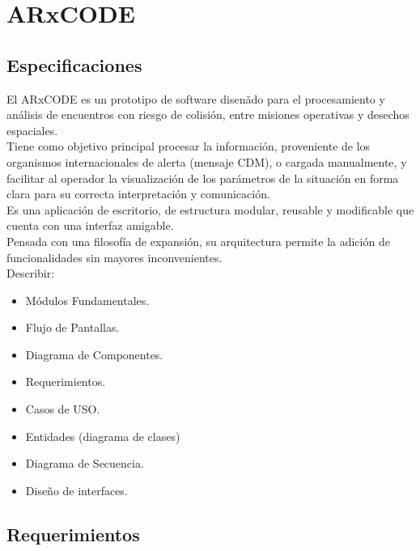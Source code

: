 \chapter{ARxCODE}
\label{chap:arxcode} 

\section{Especificaciones}

El ARxCODE es un prototipo de software disen\~ado para el procesamiento y an\'alisis de encuentros con riesgo de colisi\'on, entre misiones operativas y desechos espaciales.\\
Tiene como objetivo principal procesar la informaci\'on, proveniente de los organismos internacionales de alerta (mensaje CDM), o cargada manualmente, y facilitar al operador la visualizaci\'on de los par\'ametros de la situaci\'on en forma clara para su correcta interpretaci\'on y comunicaci\'on.\\
Es una aplicaci\'on de escritorio, de estructura modular, reusable y modificable que cuenta con una interfaz amigable.\\
Pensada con una filosof\'ia de expansi\'on, su arquitectura permite la adici\'on de funcionalidades sin mayores inconvenientes.\\

Describir:
\begin{itemize}
\itemsep0em
 \item  M\'odulos Fundamentales.
 \item Flujo de Pantallas.
 \item Diagrama de Componentes.
 \item Requerimientos.
 \item Casos de USO.
 \item Entidades (diagrama de clases)
 \item Diagrama de Secuencia.
 \item Dise\~no de interfaces.
\end{itemize}

\section{Requerimientos}


